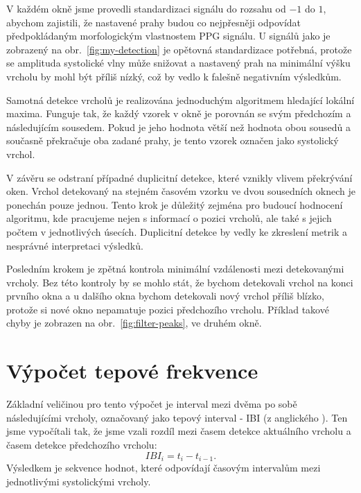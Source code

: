 V každém okně jsme provedli standardizaci signálu do rozsahu od \(-1\) do \(1\), abychom zajistili, že nastavené prahy budou co nejpřesněji odpovídat předpokládaným morfologickým vlastnostem PPG signálu.
U signálů jako je zobrazený na obr.~\ref{fig:my-detection} je opětovná standardizace potřebná, protože se amplituda systolické vlny může snižovat a nastavený prah na minimální výšku vrcholu by mohl být příliš nízký, což by vedlo k falešně negativním výsledkům.

Samotná detekce vrcholů je realizována jednoduchým algoritmem hledající lokální maxima.
Funguje tak, že každý vzorek v okně je porovnán se svým předchozím a následujícím sousedem.
Pokud je jeho hodnota větší než hodnota obou sousedů a současně překračuje oba zadané prahy, je tento vzorek označen jako systolický vrchol.

V závěru se odstraní případné duplicitní detekce, které vznikly vlivem překrývání oken.
Vrchol detekovaný na stejném časovém vzorku ve dvou sousedních oknech je ponechán pouze jednou.
Tento krok je důležitý zejména pro budoucí hodnocení algoritmu, kde pracujeme nejen s informací o pozici vrcholů, ale také s jejich počtem v jednotlivých úsecích.
Duplicitní detekce by vedly ke zkreslení metrik a nesprávné interpretaci výsledků.

Posledním krokem je zpětná kontrola minimální vzdálenosti mezi detekovanými vrcholy.
Bez této kontroly by se mohlo stát, že bychom detekovali vrchol na konci prvního okna a u dalšího okna bychom detekovali nový vrchol příliš blízko, protože si nové okno nepamatuje pozici předchozího vrcholu.
Příklad takové chyby je zobrazen na obr.~\ref{fig:filter-peaks}, ve druhém okně.

\section{Výpočet tepové frekvence}
\label{sec:alg_hr}
Základní veličinou pro tento výpočet je interval mezi dvěma po sobě následujícími vrcholy, označovaný jako tepový interval - \acs{IBI} (z anglického ).
Ten jsme vypočítali tak, že jsme vzali rozdíl mezi časem detekce aktuálního vrcholu a časem detekce předchozího vrcholu:
\begin{equation}
	\label{eq:IBI}
	IBI_{i} = t_{i} - t_{i-1}.
\end{equation}
Výsledkem je sekvence hodnot, které odpovídají časovým intervalům mezi jednotlivými systolickými vrcholy.

